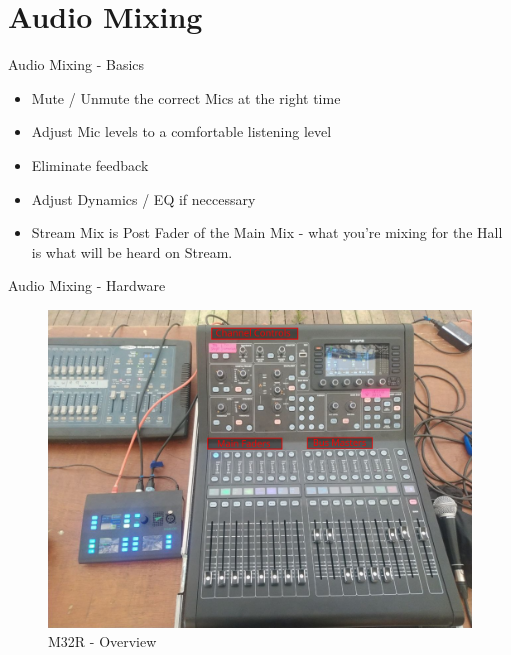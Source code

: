 \documentclass[aspectratio=169]{beamer}
\begin{document}
\section{Audio Mixing}

\begin{frame}{Audio Mixing - Basics}
	\begin{itemize}
		\item Mute / Unmute the correct Mics at the right time
		\item Adjust Mic levels to a comfortable listening level
		\item Eliminate feedback
		\item Adjust Dynamics / EQ if neccessary
		\item Stream Mix is Post Fader of the Main Mix - what you're mixing for the Hall is what will be heard on Stream.
	\end{itemize}
\end{frame}
\begin{frame}{Audio Mixing - Hardware}
	\begin{figure} 
		\centering
		\includegraphics[width=.9\textwidth]{images/m32_overview.png}
		\caption{M32R - Overview}
	\end{figure}
\end{frame}
\end{document}

